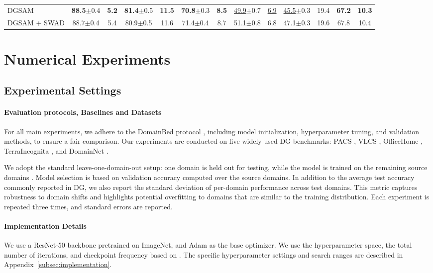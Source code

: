 \documentclass{article}
\theoremstyle{plain}
\theoremstyle{definition}
\theoremstyle{remark}
\begin{document}
\begin{table}[htbp]
{\begin{tabular}{lcccccccccc|cc}
\midrule
DGSAM & \textbf{88.5}\tiny$\pm$0.4 & \textbf{5.2} & \textbf{81.4}\tiny$\pm$0.5 & \textbf{11.5} & \textbf{70.8}\tiny$\pm$0.3 & \textbf{8.5} & \underline{49.9}\tiny$\pm$0.7 & \underline{6.9} & \underline{45.5}\tiny$\pm$0.3 & 19.4 &  {\textbf{67.2}} &  {\textbf{10.3}} \\
DGSAM + SWAD & 88.7\tiny$\pm$0.4 & 5.4 & 80.9\tiny$\pm$0.5 & 11.6 & 71.4\tiny$\pm$0.4 & 8.7 & 51.1\tiny$\pm$0.8 & 6.8 & 47.1\tiny$\pm$0.3 & 19.6 &  {67.8} &  {10.4} \\
\bottomrule
\end{tabular}}
\end{table}




\section{Numerical Experiments}
\subsection{Experimental Settings}\label{subsec:settings}

\paragraph{Evaluation protocols, Baselines and Datasets}
For all main experiments, we adhere to the DomainBed protocol \cite{gulrajani2021domainbed}, including model initialization, hyperparameter tuning, and validation methods, to ensure a fair comparison. Our experiments are conducted on five widely used DG benchmarks: PACS \citep{li2017pacs}, VLCS \citep{fang2013VLCS}, OfficeHome \citep{venkateswara2017office}, TerraIncognita \citep{beery2018terra}, and DomainNet \citep{peng2019domainnet}.

We adopt the standard leave-one-domain-out setup: one domain is held out for testing, while the model is trained on the remaining source domains \cite{gulrajani2021domainbed}.  Model selection is based on validation accuracy computed over the source domains. In addition to the average test accuracy commonly reported in DG, we also report the standard deviation of per-domain performance across test domains. This metric captures robustness to domain shifts and highlights potential overfitting to domains that are similar to the training distribution. Each experiment is repeated three times, and standard errors are reported.


\paragraph{Implementation Details}
We use a ResNet-50 \cite{he2016resnet} backbone pretrained on ImageNet, and Adam \cite{Kingma2015Adam} as the base optimizer. We use the hyperparameter space, the total number of iterations, and checkpoint frequency based on \cite{wang2023sagm}. The specific hyperparameter settings and search ranges are described in Appendix~\ref{subsec:implementation}. 
\end{document}
